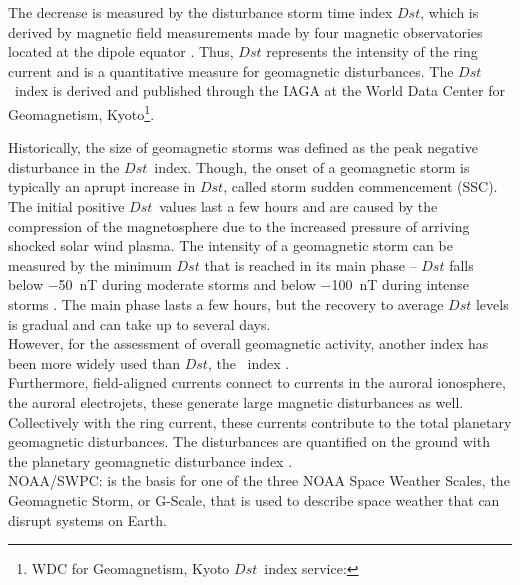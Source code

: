 The decrease is measured by the disturbance storm time index $Dst$, which is derived by magnetic field measurements made by four magnetic observatories located at the dipole equator \citep{Sugiura1991}. Thus, $Dst$ represents the intensity of the ring current and is a quantitative measure for geomagnetic disturbances. The $Dst$~index is derived and published through the IAGA at the World Data Center for Geomagnetism, Kyoto\footnote{WDC for Geomagnetism, Kyoto $Dst$~index service: }.

Historically, the size of geomagnetic storms was defined as the peak negative disturbance in the $Dst$~index. Though, the onset of a geomagnetic storm is typically an aprupt increase in $Dst$, called storm sudden commencement (SSC). The initial positive $Dst$~values last a few hours and are caused by the compression of the magnetosphere due to the increased pressure of arriving shocked solar wind plasma. The intensity of a geomagnetic storm can be measured by the minimum $Dst$ that is reached in its main phase -- $Dst$ falls below \SI{-50}{\nano\tesla} during moderate storms and below \SI{-100}{\nano\tesla} during intense storms \citep{Gonzalez1994}. The main phase lasts a few hours, but the recovery to average $Dst$ levels is gradual and can take up to several days.\\

However, for the assessment of overall geomagnetic activity, another index has been more widely used than $Dst$, the \Kp{}~index \citep{Gonzalez1994}.\\


Furthermore, field-aligned currents connect to currents in the auroral ionosphere, the auroral electrojets, these generate large magnetic disturbances as well. Collectively with the ring current, these currents contribute to the total planetary geomagnetic disturbances. The disturbances are quantified on the ground with the planetary geomagnetic disturbance index \Kp{}.\\




NOAA/SWPC: \Kp{} is the basis for one of the three NOAA Space Weather Scales, the Geomagnetic Storm, or G-Scale, that is used to describe space weather that can disrupt systems on Earth.\\


